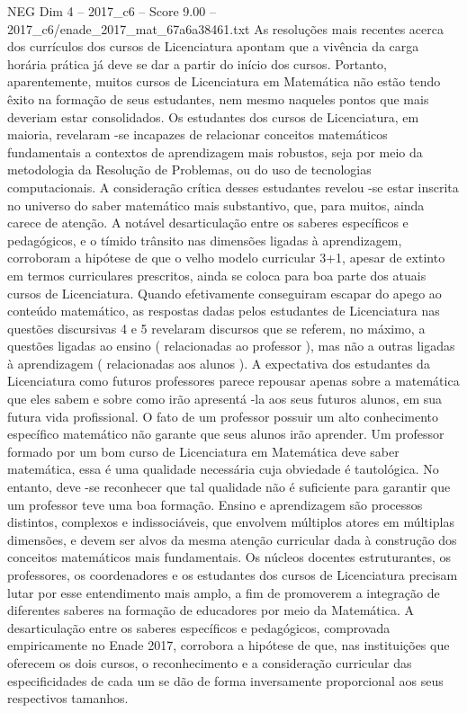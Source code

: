 \begin{textsample}{NEG Dim 4 – 2017\_c6 – Score 9.00 – 2017\_c6/enade\_2017\_mat\_67a6a38461.txt}
As resoluções mais recentes acerca dos currículos dos cursos de Licenciatura apontam que a vivência da carga horária prática já deve se dar a partir do início dos cursos.
Portanto, aparentemente, muitos cursos de Licenciatura em Matemática não estão tendo êxito na formação de seus estudantes, nem mesmo naqueles pontos que mais deveriam estar consolidados.
Os estudantes dos cursos de Licenciatura, em maioria, revelaram -se incapazes de relacionar conceitos matemáticos fundamentais a contextos de aprendizagem mais robustos, seja por meio da metodologia da Resolução de Problemas, ou do uso de tecnologias computacionais.
A consideração crítica desses estudantes revelou -se estar inscrita no universo do saber matemático mais substantivo, que, para muitos, ainda carece de atenção.
A notável desarticulação entre os saberes específicos e pedagógicos, e o tímido trânsito nas dimensões ligadas à aprendizagem, corroboram a hipótese de que o velho modelo curricular 3+1, apesar de extinto em termos curriculares prescritos, ainda se coloca para boa parte dos atuais cursos de Licenciatura.
Quando efetivamente conseguiram escapar do apego ao conteúdo matemático, as respostas dadas pelos estudantes de Licenciatura nas questões discursivas 4 e 5 revelaram discursos que se referem, no máximo, a questões ligadas ao ensino ( relacionadas ao professor ), mas não a outras ligadas à aprendizagem ( relacionadas aos alunos ).
A expectativa dos estudantes da Licenciatura como futuros professores parece repousar apenas sobre a matemática que eles sabem e sobre como irão apresentá -la aos seus futuros alunos, em sua futura vida profissional.
O fato de um professor possuir um alto conhecimento específico matemático não garante que seus alunos irão aprender.
Um professor formado por um bom curso de Licenciatura em Matemática deve saber matemática, essa é uma qualidade necessária cuja obviedade é tautológica.
No entanto, deve -se reconhecer que tal qualidade não é suficiente para garantir que um professor teve uma boa formação.
Ensino e aprendizagem são processos distintos, complexos e indissociáveis, que envolvem múltiplos atores em múltiplas dimensões, e devem ser alvos da mesma atenção curricular dada à construção dos conceitos matemáticos mais fundamentais.
Os núcleos docentes estruturantes, os professores, os coordenadores e os estudantes dos cursos de Licenciatura precisam lutar por esse entendimento mais amplo, a fim de promoverem a integração de diferentes saberes na formação de educadores por meio da Matemática.
A desarticulação entre os saberes específicos e pedagógicos, comprovada empiricamente no Enade 2017, corrobora a hipótese de que, nas instituições que oferecem os dois cursos, o reconhecimento e a consideração curricular das especificidades de cada um se dão de forma inversamente proporcional aos seus respectivos tamanhos.

\end{textsample}
